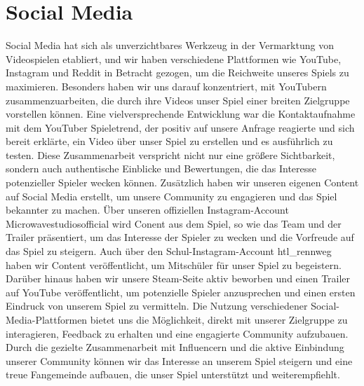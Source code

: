 
\section{Social Media}\label{sec:social-media}

\renewcommand{\kapitelautor}{Autor: Irgendwer} %


%
Social Media hat sich als unverzichtbares Werkzeug in der Vermarktung von Videospielen etabliert, und wir haben verschiedene Plattformen wie YouTube, Instagram und Reddit in Betracht gezogen, um die Reichweite unseres Spiels zu maximieren.
Besonders haben wir uns darauf konzentriert, mit YouTubern zusammenzuarbeiten, die durch ihre Videos unser Spiel einer breiten Zielgruppe vorstellen können.
Eine vielversprechende Entwicklung war die Kontaktaufnahme mit dem YouTuber Spieletrend, der positiv auf unsere Anfrage reagierte und sich bereit erklärte,
ein Video über unser Spiel zu erstellen und es ausführlich zu testen. Diese Zusammenarbeit verspricht nicht nur eine größere Sichtbarkeit, sondern auch authentische Einblicke und Bewertungen,
die das Interesse potenzieller Spieler wecken können. Zusätzlich haben wir unseren eigenen Content auf Social Media erstellt, um unsere Community zu engagieren und das Spiel bekannter zu machen.
Über unseren offiziellen Instagram-Account Microwavestudiosofficial wird Conent aus dem Spiel, so wie das Team und der Trailer präsentiert, um das Interesse der Spieler zu wecken und die Vorfreude auf das Spiel zu steigern.
Auch über den Schul-Instagram-Account htl\_rennweg haben wir Content veröffentlicht, um Mitschüler für unser Spiel zu begeistern.
Darüber hinaus haben wir unsere Steam-Seite aktiv beworben und einen Trailer auf YouTube veröffentlicht, um potenzielle Spieler anzusprechen und einen ersten Eindruck von unserem Spiel zu vermitteln.
Die Nutzung verschiedener Social-Media-Plattformen bietet uns die Möglichkeit, direkt mit unserer Zielgruppe zu interagieren, Feedback zu erhalten und eine engagierte Community aufzubauen.
Durch die gezielte Zusammenarbeit mit Influencern und die aktive Einbindung unserer Community können wir das Interesse an unserem Spiel steigern und eine treue Fangemeinde aufbauen, die unser Spiel unterstützt und weiterempfiehlt.
%

\renewcommand{\kapitelautor}{}
